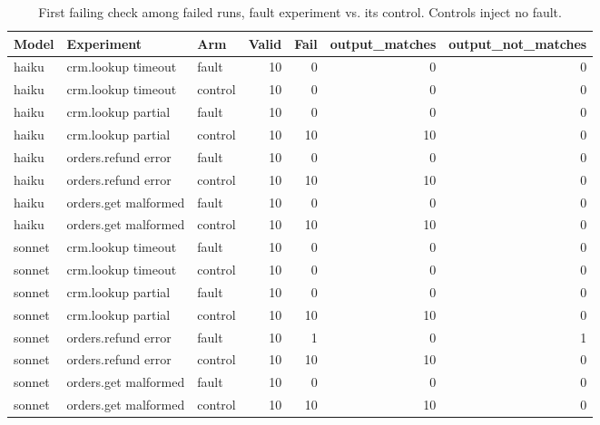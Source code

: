 \begin{table}[t]
\centering
\caption{First failing check among failed runs, fault experiment vs. its control. Controls inject no fault.}
\label{tab:rq2}
\begin{tabular}{lllrrrr}
\hline
Model & Experiment & Arm & Valid & Fail & output\_matches & output\_not\_matches \\
\hline
haiku & crm.lookup timeout & fault & 10 & 0 & 0 & 0 \\
haiku & crm.lookup timeout & control & 10 & 0 & 0 & 0 \\
\hline
haiku & crm.lookup partial & fault & 10 & 0 & 0 & 0 \\
haiku & crm.lookup partial & control & 10 & 10 & 10 & 0 \\
\hline
haiku & orders.refund error & fault & 10 & 0 & 0 & 0 \\
haiku & orders.refund error & control & 10 & 10 & 10 & 0 \\
\hline
haiku & orders.get malformed & fault & 10 & 0 & 0 & 0 \\
haiku & orders.get malformed & control & 10 & 10 & 10 & 0 \\
\hline
sonnet & crm.lookup timeout & fault & 10 & 0 & 0 & 0 \\
sonnet & crm.lookup timeout & control & 10 & 0 & 0 & 0 \\
\hline
sonnet & crm.lookup partial & fault & 10 & 0 & 0 & 0 \\
sonnet & crm.lookup partial & control & 10 & 10 & 10 & 0 \\
\hline
sonnet & orders.refund error & fault & 10 & 1 & 0 & 1 \\
sonnet & orders.refund error & control & 10 & 10 & 10 & 0 \\
\hline
sonnet & orders.get malformed & fault & 10 & 0 & 0 & 0 \\
sonnet & orders.get malformed & control & 10 & 10 & 10 & 0 \\
\hline
\end{tabular}
\end{table}
